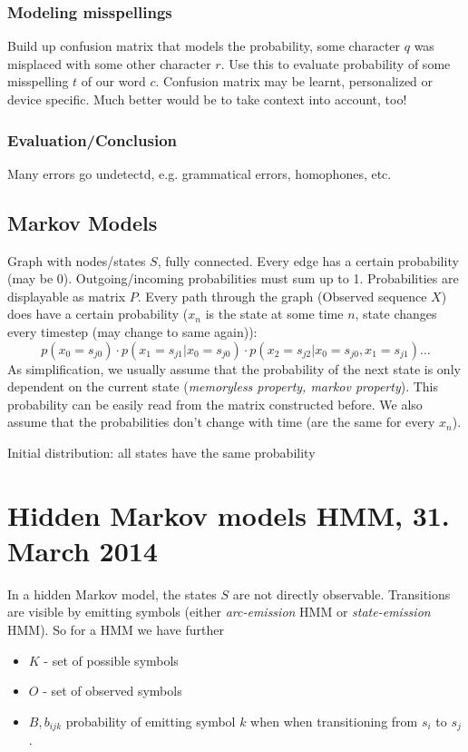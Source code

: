 \documentclass[11pt]{article}
\begin{document}
\subsubsection{Modeling misspellings}
\label{ssub:model_misspellings}
Build up confusion matrix that models the probability, some character $q$ was misplaced with some other character $r$. Use this to evaluate probability of some misspelling $t$ of our word $c$. Confusion matrix may be learnt, personalized or device specific. Much better would be to take context into account, too!


\subsubsection{Evaluation/Conclusion}
Many errors go undetectd, e.g. grammatical errors, homophones, etc.

\subsection{Markov Models}
\label{sec:markov_models}
Graph with nodes/states $S$, fully connected. Every edge has a certain probability 
(may be 0). Outgoing/incoming probabilities must sum up to 1. Probabilities are displayable 
as matrix $P$. Every path through the graph (Observed sequence $X$) does have a certain probability ($x_n$ is the state
at some time $n$, state changes every timestep (may change to same again)):
\begin{equation}
	p(x_0 = s_{j0}) \cdot p(x_1 = s_{j1} |x_0 = s_{j0}) \cdot p(x_2 = s_{j2} | x_0 = s_{j0}, x_1 = s_{j1})\ldots
\end{equation}
As simplification, we usually assume that the probability of the 
next state is only dependent on the current state (\emph{memoryless property, markov property}). This probability can be easily read from the matrix constructed before.
We also assume that the probabilities don't change with time (are the same for every $x_n$).

Initial distribution: all states have the same probability

\section{Hidden Markov models HMM, 31. March 2014}
In a hidden Markov model, the states $S$ are not directly observable. Transitions are visible
by emitting symbols (either \emph{arc-emission} HMM or \emph{state-emission} HMM).
So for a HMM we have further
\begin{itemize}
	\item $K$ - set of possible symbols
	\item $O$ - set of observed symbols
	\item $B, b_{ijk}$ probability of emitting symbol $k$ when when transitioning from 
	$s_i$ to $s_j$.
\end{itemize}
\end{document}
